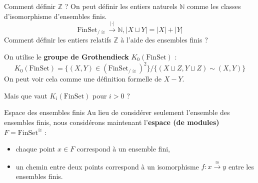 \documentclass[12pt]{beamer}
\begin{document}
\begin{frame}{Comment définir $\mathbb{Z}$ ?}
\pause
On peut définir les entiers naturels $\mathbb{N}$ comme les classes d’isomorphisme d’ensembles finis.
\[
  \mathrm{FinSet}_{/\cong} \xrightarrow{|\cdot|} \mathbb{N}, |X \sqcup Y| = |X|+|Y| 
\]
Comment définir les entiers relatifs $\mathbb{Z}$ à l’aide des ensembles finis ? 

\pause
On utilise le \textbf{groupe de Grothendieck} $K_0(\mathrm{FinSet})$ :
\[
  K_0(\mathrm{FinSet}) = \{ (X,Y)\in (\mathrm{FinSet}_{/\cong})^2   \} / \{ (X \sqcup Z , Y \sqcup Z) \sim (X,Y)\}
\]
On peut voir cela comme une définition formelle de $X-Y$.

\pause
Mais que vaut $K_i(\mathrm{FinSet})$ pour $i>0$ ?
\end{frame}
\begin{frame}{Espace des ensembles finis}
  Au lieu de considérer seulement l’ensemble des ensembles finis, nous considérons maintenant l’\textbf{espace (de modules)} $F = \mathrm{FinSet}^{\cong}$ : 
\begin{itemize}
  \item chaque point $x\in F$ correspond à un ensemble fini,
  \item un chemin entre deux points correspond à un isomorphisme $f:x\xrightarrow{\cong} y$ entre les ensembles finis.
\end{itemize}
  \pause

\begin{center}


\begin{tikzpicture}[x=0.75pt,y=0.75pt,yscale=-1,xscale=1]


\end{tikzpicture}
\end{center}
\end{frame}
\end{document}
